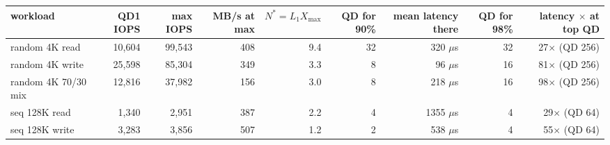 \begin{tabular}{lrrrrrrrr}
\toprule
workload & QD1 IOPS & max IOPS & MB/s at max & $N^{*}=L_1 X_{\max}$ & QD for 90\% & mean latency there & QD for 98\% & latency $\times$ at top QD \\
\midrule
random 4K read & 10,604 & 99,543 & 408 & 9.4 & 32 & 320 $\mu$s & 32 & 27$\times$ (QD 256) \\
random 4K write & 25,598 & 85,304 & 349 & 3.3 & 8 & 96 $\mu$s & 16 & 81$\times$ (QD 256) \\
random 4K 70/30 mix & 12,816 & 37,982 & 156 & 3.0 & 8 & 218 $\mu$s & 16 & 98$\times$ (QD 256) \\
seq 128K read & 1,340 & 2,951 & 387 & 2.2 & 4 & 1355 $\mu$s & 4 & 29$\times$ (QD 64) \\
seq 128K write & 3,283 & 3,856 & 507 & 1.2 & 2 & 538 $\mu$s & 4 & 55$\times$ (QD 64) \\
\bottomrule
\end{tabular}
